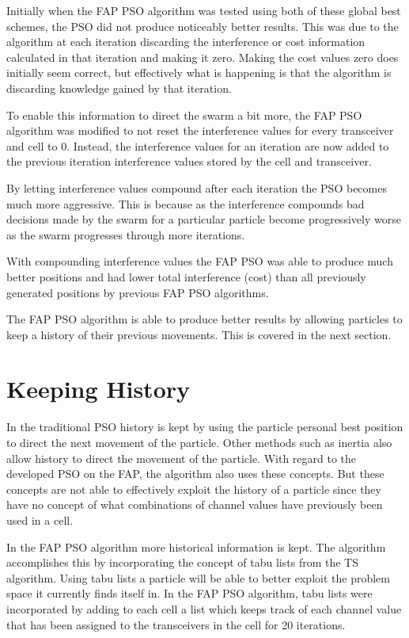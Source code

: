 Initially when the FAP PSO algorithm was tested using both of these global best schemes, the PSO did not produce noticeably better results. This was due to the algorithm at each iteration discarding the interference or cost information calculated in that iteration and making it zero. Making the cost values zero does initially seem correct, but effectively what is happening is that the algorithm is discarding knowledge gained by that iteration.

To enable this information to direct the swarm a bit more, the FAP PSO algorithm was modified to not reset the interference values for every transceiver and cell to 0. Instead, the interference values for an iteration are now added to the previous iteration interference values stored by the cell and transceiver. 

By letting interference values compound after each iteration the PSO becomes much more aggressive. This is because as the interference compounds bad decisions made by the swarm for a particular particle become progressively worse as the swarm progresses through more iterations.

With compounding interference values the FAP PSO was able to produce much better positions and had lower total interference (cost) than all previously generated positions by previous FAP PSO algorithms. 

The FAP PSO algorithm is able to produce better results by allowing particles to keep a history of their previous movements. This is covered in the next section.
\section{Keeping History}
\label{sec:keepinghistory}
In the traditional PSO history is kept by using the particle personal best position to direct the next movement of the particle. Other methods such as inertia also allow history to direct the movement of the particle. With regard to the developed PSO on the FAP, the algorithm also uses these concepts. But these concepts are not able to effectively exploit the history of a particle since they have no concept of what combinations of channel values have previously been used in a cell.

In the FAP PSO algorithm more historical information is kept. The algorithm accomplishes this by incorporating the concept of tabu lists from the TS algorithm. Using tabu lists a particle will be able to better exploit the problem space it currently finds itself in. In the FAP PSO algorithm, tabu lists were incorporated by adding to each cell a list which keeps track of each channel value that has been assigned to the transceivers in the cell for 20 iterations.

